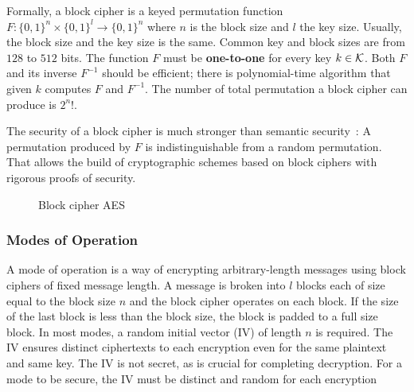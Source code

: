 Formally, a block cipher is a keyed permutation function $F: \{ 0, 1\}^{n} \times \{ 0, 1\}^{l} \rightarrow \{ 0, 1\}^{n}$ where $n$ is the block size and $l$ the key size. Usually, the block size and the key size is the same. Common key and block sizes are from $128$ to $512$ bits. The function $F$ must be \textbf{one-to-one} for every key $k \in \mathcal{K}$. Both $F$ and its inverse $F^{-1}$ should be efficient; there is polynomial-time algorithm that given $k$ computes $F$ and $F^{-1}$. The number of total permutation a block cipher can produce is $2^{n}!$.

The security of a block cipher is much stronger than semantic security~\cite{boneh_crypto}: A permutation produced by $F$ is indistinguishable from a random permutation. That allows the build of cryptographic schemes based on block ciphers with rigorous proofs of security.

\begin{figure}[!ht]
    \centering
  \caption{Block cipher AES}
  \label{fig:sym:block:aes}
\end{figure}

\subsubsection[Modes of Operation]{Modes of Operation~\cite{Katz:2014:IMC:2700550}}
\label{preliminaries:sym:modes}

A mode of operation is a way of encrypting arbitrary-length messages using block ciphers of fixed message length. A message is broken into $l$ blocks each of size equal to the block size $n$ and the block cipher operates on each block. If the size of the last block is less than the block size, the block is padded to a full size block. In most modes, a random initial vector (IV) of length $n$ is required. The IV ensures distinct ciphertexts to each encryption even for the same plaintext and same key. The IV is not secret, as is crucial for completing decryption. For a mode to be secure, the IV must be distinct and random for each encryption~\cite{Katz:2014:IMC:2700550}

